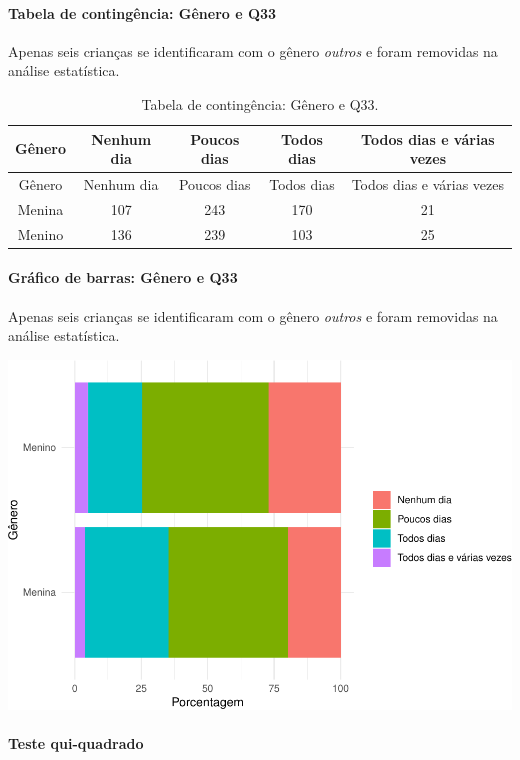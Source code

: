 \documentclass[]{article}
\let\oldparagraph\paragraph
\renewcommand{\paragraph}[1]{\oldparagraph{#1}\mbox{}}
\begin{document}
\cleardoublepage

\hypertarget{tabela-de-continguxeancia-guxeanero-e-q33}{%
\paragraph{Tabela de contingência: Gênero e Q33}\label{tabela-de-continguxeancia-guxeanero-e-q33}}

Apenas seis crianças se identificaram com o gênero \emph{outros} e foram removidas na análise estatística.

\begin{longtable}[]{@{}ccccc@{}}
\caption{\label{tab:unnamed-chunk-1143}Tabela de contingência: Gênero e Q33.}\tabularnewline
\toprule
Gênero & Nenhum dia & Poucos dias & Todos dias & Todos dias e várias vezes\tabularnewline
\midrule
\endfirsthead
\toprule
Gênero & Nenhum dia & Poucos dias & Todos dias & Todos dias e várias vezes\tabularnewline
\midrule
\endhead
Menina & 107 & 243 & 170 & 21\tabularnewline
Menino & 136 & 239 & 103 & 25\tabularnewline
\bottomrule
\end{longtable}

\hypertarget{gruxe1fico-de-barras-guxeanero-e-q33}{%
\paragraph{Gráfico de barras: Gênero e Q33}\label{gruxe1fico-de-barras-guxeanero-e-q33}}

Apenas seis crianças se identificaram com o gênero \emph{outros} e foram removidas na análise estatística.

\begin{center}\includegraphics[width=0.75\linewidth]{relatorio_covid19_files/figure-latex/unnamed-chunk-1144-1} \end{center}

\hypertarget{teste-qui-quadrado-98}{%
\paragraph{Teste qui-quadrado}\label{teste-qui-quadrado-98}}
\end{document}
